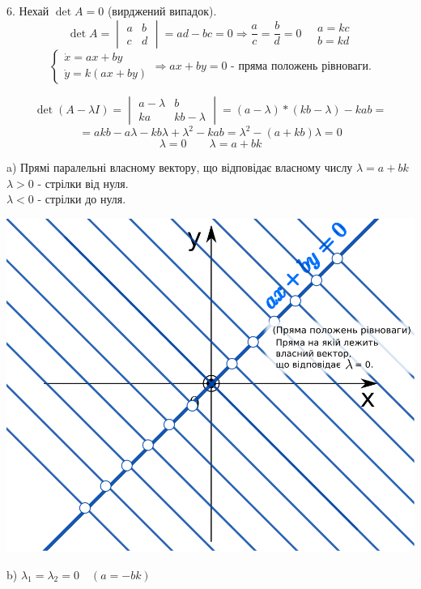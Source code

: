     6. Нехай $ \det A = 0$ (вирджений випадок).\\
    $$
    \det A  =  \begin{vmatrix}
      a & b\\
      c & d
    \end{vmatrix} = ad - bc  = 0 \Rightarrow \frac{a}{c} = \frac{b}{d} = 0 \quad \begin{gathered}
     a = kc\\
     b = kd
    \end{gathered}
    $$
    $$
    \begin{cases}
        \dot{x} = ax+ by\\
        \dot{y} = k(ax + by)
    \end{cases} \Rightarrow ax + by  = 0 \text{ - пряма положень рівноваги.}
    $$

    $$
    \det ( A - \lambda I) = \begin{vmatrix}
      a - \lambda & b\\
      ka & kb - \lambda
    \end{vmatrix} = (a-\lambda)*(kb- \lambda) - kab =
    $$
    $$
     = akb - a \lambda - kb \lambda +  \lambda^2 - kab = \lambda^2 - (a + kb) \lambda =0
     $$
     $$
     \lambda = 0 \qquad \lambda = a + bk
     $$

     a) Прямі паралельні власному вектору, що відповідає власному числу $\lambda =  a + bk$\\
     $\lambda > 0 $ - стрілки від нуля.\\
     $\lambda < 0 $ - стрілки до нуля.\\

     \begin{center} \includegraphics[scale=0.3]{assets/lectures_recent-058ceaff.png} \end{center}
    b) $ \lambda_1 =  \lambda_2 = 0 \quad (a = - bk)$

